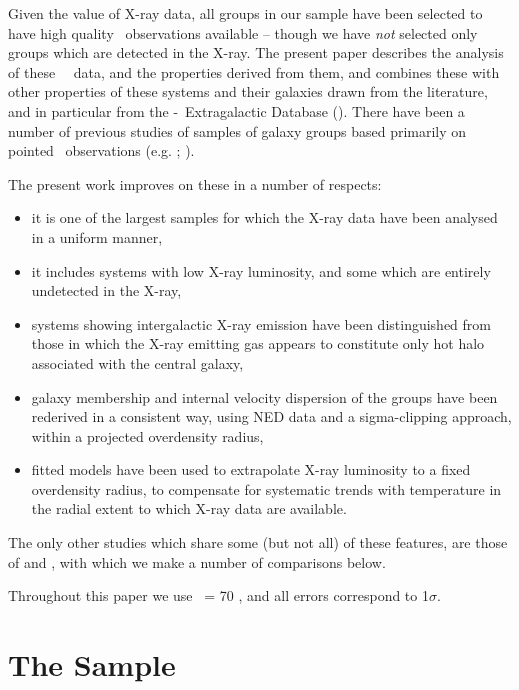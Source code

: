 \documentclass[usenatbib]{mn2e}
\begin{document}
Given the value of X-ray data, all groups in our sample have been selected to
have high quality \ROSAT\ observations available -- though we have {\it not}
selected only groups which are detected in the X-ray. The present paper describes
the analysis of these \ROSAT\ \PSPC\ data, and the properties derived from them,
and combines these with other properties of these systems and their galaxies
drawn from the literature, and in particular from the \NASA-\IPAC\ Extragalactic
Database (\NED).  There have been a number of previous studies of samples of
galaxy groups based primarily on pointed \ROSAT\ observations
(e.g. \citealt*{pildis95};
\citealt{mulchaey96,ponman96,mulchaey98,helsdon00a,helsdon00b,mulchaey03}). 

The present work improves on these in a number of respects: 

\begin{itemize}
\item it is one of the largest samples for which the X-ray data have been
analysed in a uniform manner, 
\item it includes systems with low X-ray luminosity, and some which are entirely
undetected in the X-ray,
\item systems showing intergalactic X-ray emission have been distinguished from
those in which the X-ray emitting gas appears to constitute only hot halo
associated with the central galaxy,
\item galaxy membership and internal velocity dispersion of the groups have been
rederived in a consistent way, using NED data and a sigma-clipping approach,
within a projected overdensity radius,
\item fitted models have been used to extrapolate X-ray luminosity to a fixed
overdensity radius, to compensate for systematic trends with temperature in the
radial extent to which X-ray data are available.
\end{itemize}

The only other studies which share some (but not all) of these features, are
those of \citet{helsdon00a,helsdon00b} and \citet{mulchaey03}, with which we make
a number of comparisons below.

Throughout this paper we use \Hzero\ = 70 \kmpspMpc, and all errors correspond
to 1$\sigma$.


\section{The Sample}
\label{sec_sample}
\end{document}
